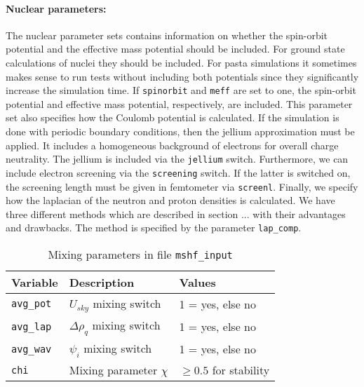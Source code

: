 \documentclass[4p]{elsarticle}
\begin{document}
\paragraph{Nuclear parameters:} The nuclear parameter sets contains information on whether the spin-orbit potential and the effective mass potential should be included. For ground state calculations of nuclei they should be included. For pasta simulations it sometimes makes sense to run tests without including both potentials since they significantly increase the simulation time. If {\tt spinorbit} and {\tt meff} are set to one, the spin-orbit potential and effective mass potential, respectively, are included. This parameter set also specifies how the Coulomb potential is calculated. If the simulation is done with periodic boundary conditions, then the jellium approximation must be applied. It includes a homogeneous background of electrons for overall charge neutrality. The jellium is included via the {\tt jellium} switch. Furthermore, we can include electron screening via the {\tt screening} switch. If the latter is switched on, the screening length must be given in femtometer via {\tt screenl}. Finally, we specify how the laplacian of the neutron and proton densities is calculated. We have three different methods which are described in section ... with their advantages and drawbacks. The method is specified by the parameter {\tt lap\_comp}.
\begin{table}
\caption{Mixing parameters in file \texttt{mshf\_input}}
\begin{tabular*}{\columnwidth}{ l l l}
\hline
\hline
Variable & Description & Values\\
\hline
{\tt avg\_pot}                & $U_{sky}$ mixing switch                   & 1 = yes, else no\\
\texttt{avg\_lap}           & $\Delta \rho_q$ mixing switch           & 1 = yes, else no\\
\texttt{avg\_wav}         & $\psi_i$ mixing switch                       & 1 = yes, else no\\
\texttt{chi}                    & Mixing parameter $\chi$                   & $\geq 0.5$ for stability \\ 
\hline
\hline
\end{tabular*}
\label{table3}
\end{table}
\end{document}
